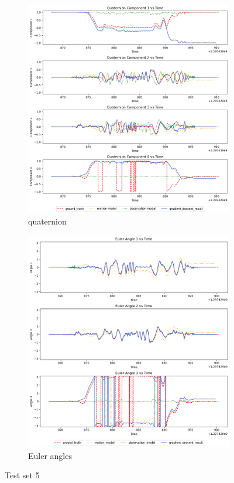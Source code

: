 \documentclass[conference]{IEEEtran}
\begin{document}
\begin{figure}[h]
    \centering
    \begin{subfigure}{0.4\textwidth}
        \includegraphics[width=\linewidth]{../img/5_qt.png}
        \caption{quaternion}
    \end{subfigure}
    \hfill
    \begin{subfigure}{0.4\textwidth}
        \includegraphics[width=\linewidth]{../img/5_ea.png}
        \caption{Euler angles}
    \end{subfigure}
    \caption{Test set 5}
    \label{fig:set5}
\end{figure}
\end{document}
